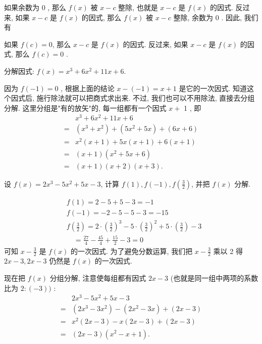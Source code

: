 如果余数为 0 , 那么 $f(x)$ 被 $x-c$ 整除, 也就是 $x-c$ 是 $f(x)$ 的因式. 反过来, 如果 $x-c$ 是 $f(x)$ 的因式, 那么 $f(x)$ 被 $x-c$ 整除, 余数为 0 . 因此, 我们有

如果 $f(c)=0$, 那么 $x-c$ 是 $f(x)$ 的因式. 反过来, 如果 $x-c$ 是 $f(x)$ 的因式, 那么 $f(c)=0$ .

\begin{example}
	分解因式: $f(x)=x^{3}+6 x^{2}+11 x+6$.
\end{example}
\begin{solution}
	因为 $f(-1)=0$ , 根据上面的结论 $x-(-1)=x+1$ 是它的一次因式. 知道这个因式后, 施行除法就可以把商式求出来. 不过, 我们也可以不用除法, 直接去分组分解. 这里分组是"有的放矢"的, 每一组都有一个因式 $x+$ 1 , 即
	\begin{align*}
		  & x^{3}+6 x^{2}+11 x+6                                      \\
		= & \left(x^{3}+x^{2}\right)+\left(5 x^{2}+5 x\right)+(6 x+6) \\
		= & x^{2}(x+1)+5 x(x+1)+6(x+1)                                \\
		= & (x+1)\left(x^{2}+5 x+6\right)                             \\
		= & (x+1)(x+2)(x+3) .
	\end{align*}
\end{solution}

\begin{example}
	设 $f(x)=2 x^{3}-5 x^{2}+5 x-3$, 计算 $f(1), f(-1), f\left(\frac{3}{2}\right)$, 并把 $f(x)$ 分解.
\end{example}
\begin{solution}
	\begin{align*}
		 & f(1)=2-5+5-3=-1                                                                                                                     \\
		 & f(-1)=-2-5-5-3=-15                                                                                                                  \\
		 & f\left(\frac{3}{2}\right)=2 \cdot\left(\frac{3}{2}\right)^{3}-5 \cdot\left(\frac{3}{2}\right)^{2}+5 \cdot\left(\frac{3}{2}\right)-3 \\
		 & \quad=\frac{27}{4}-\frac{45}{4}+\frac{15}{2}-3=0
	\end{align*}
	可知 $x-\frac{3}{2}$ 是 $f(x)$ 的一次因式. 为了避免分数运算, 我们把 $x-\frac{3}{2}$ 乘以 2 得 $2 x-3,2 x-3$ 仍然是 $f(x)$ 的一次因式.

	现在把 $f(x)$ 分组分解, 注意使每组都有因式 $2 x-3$ (也就是同一组中两项的系数比为 $2:(-3))$ :
	\begin{align*}
		  & 2 x^{3}-5 x^{2}+5 x-3                                         \\
		= & \left(2 x^{3}-3 x^{2}\right)-\left(2 x^{2}-3 x\right)+(2 x-3) \\
		= & x^{2}(2 x-3)-x(2 x-3)+(2 x-3)                                 \\
		= & (2 x-3)\left(x^{2}-x+1\right) .
	\end{align*}
\end{solution}

